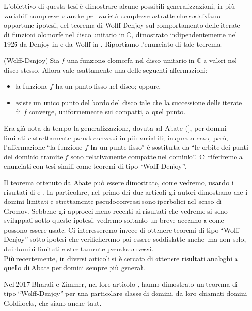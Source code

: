 L'obiettivo di questa tesi è dimostrare alcune possibili generalizzazioni, in più variabili complesse o anche per varietà complesse astratte che soddisfano opportune ipotesi, del teorema di Wolff-Denjoy sul comportamento delle iterate di funzioni olomorfe nel disco unitario in $\mathbb{C}$, dimostrato indipendentemente nel 1926 da Denjoy in \cite{D} e da Wolff in \cite{Wo}. Riportiamo l'enunciato di tale teorema.

\begin{thm}
    (Wolff-Denjoy) Sia $f$ una funzione olomorfa nel disco unitario in $\mathbb{C}$ a valori nel disco stesso. Allora vale esattamente una delle seguenti affermazioni:
    \begin{itemize}
        \item la funzione $f$ ha un punto fisso nel disco; oppure,
        \item esiste un unico punto del bordo del disco tale che la successione delle iterate di $f$ converge, uniformemente sui compatti, a quel punto.
    \end{itemize}
\end{thm}

Era già nota da tempo la generalizzazione, dovuta ad Abate (\cite[Theorem 0.5]{A2}), per domini limitati e strettamente pseudoconvessi in più variabili; in questo caso, però, l'affermazione ``la funzione $f$ ha un punto fisso'' è sostituita da ``le orbite dei punti del dominio tramite $f$ sono relativamente compatte nel dominio''. Ci riferiremo a enunciati con tesi simili come teoremi di tipo ``Wolff-Denjoy''.

Il teorema ottenuto da Abate può essere dimostrato, come vedremo, usando i risultati di \cite{BB} e \cite{Ka}. In particolare, nel primo dei due articoli gli autori dimostrano che i domini limitati e strettamente pseudoconvessi sono iperbolici nel senso di Gromov. Sebbene gli approcci meno recenti ai risultati che vedremo si sono sviluppati sotto queste ipotesi, vedremo soltanto un breve accenno a come possono essere usate. Ci interesseremo invece di ottenere teoremi di tipo ``Wolff-Denjoy'' sotto ipotesi che verificheremo poi essere soddisfatte anche, ma non solo, dai domini limitati e strettamente pseudoconvessi.\\

Più recentemente, in diversi articoli si è cercato di ottenere risultati analoghi a quello di Abate per domini sempre più generali.

Nel 2017 Bharali e Zimmer, nel loro articolo \cite{BZ1}, hanno dimostrato un teorema di tipo ``Wolff-Denjoy'' per una particolare classe di domini, da loro chiamati domini Goldilocks, che siano anche taut.

